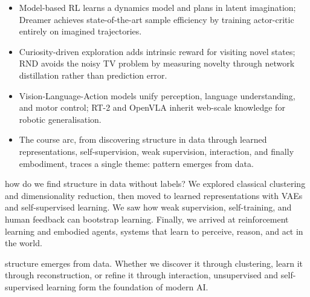 \vspace{1.5em}


\begin{itemize}
    \item Model-based RL learns a dynamics model and plans in latent imagination; Dreamer achieves state-of-the-art sample efficiency by training actor-critic entirely on imagined trajectories.
    \item Curiosity-driven exploration adds intrinsic reward for visiting novel states; RND avoids the noisy TV problem by measuring novelty through network distillation rather than prediction error.
    \item Vision-Language-Action models unify perception, language understanding, and motor control; RT-2 and OpenVLA inherit web-scale knowledge for robotic generalisation.
    \item The course arc, from discovering structure in data through learned representations, self-supervision, weak supervision, interaction, and finally embodiment, traces a single theme: pattern emerges from data.
\end{itemize}

\vspace{2.5em}

 how do we find structure in data without labels? We explored classical clustering and dimensionality reduction, then moved to learned representations with VAEs and self-supervised learning. We saw how weak supervision, self-training, and human feedback can bootstrap learning. Finally, we arrived at reinforcement learning and embodied agents, systems that learn to perceive, reason, and act in the world.


 structure emerges from data. Whether we discover it through clustering, learn it through reconstruction, or refine it through interaction, unsupervised and self-supervised learning form the foundation of modern AI.

